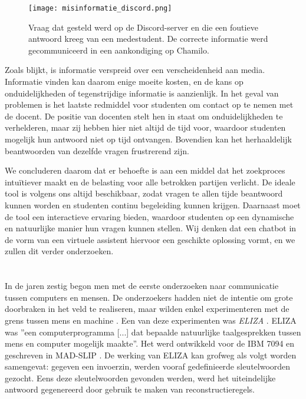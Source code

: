 \begin{figure}
  \centering
  \texttt{[image: misinformatie\_discord.png]}
  \caption[Misinformatie op Discord-server]{\label{fig:misinformatie_discord}Vraag dat gesteld werd op de Discord-server en die een foutieve antwoord kreeg van een medestudent. De correcte informatie werd gecommuniceerd in een aankondiging op Chamilo.}
\end{figure}

Zoals blijkt, is informatie verspreid over een verscheidenheid aan media. Informatie vinden kan daarom enige moeite kosten, en de kans op onduidelijkheden of tegenstrijdige informatie is aanzienlijk. In het geval van problemen is het laatste redmiddel voor studenten om contact op te nemen met de docent. De positie van docenten stelt hen in staat om onduidelijkheden te verhelderen, maar zij hebben hier niet altijd de tijd voor, waardoor studenten mogelijk hun antwoord niet op tijd ontvangen. Bovendien kan het herhaaldelijk beantwoorden van dezelfde vragen frustrerend zijn.

We concluderen daarom dat er behoefte is aan een middel dat het zoekproces intuïtiever maakt en de belasting voor alle betrokken partijen verlicht. De ideale tool is volgens ons altijd beschikbaar, zodat vragen te allen tijde beantwoord kunnen worden en studenten continu begeleiding kunnen krijgen. Daarnaast moet de tool een interactieve ervaring bieden, waardoor studenten op een dynamische en natuurlijke manier hun vragen kunnen stellen. Wij denken dat een chatbot in de vorm van een virtuele assistent hiervoor een geschikte oplossing vormt, en we zullen dit verder onderzoeken.

\section{}%
\label{sec:chatbots}

In de jaren zestig begon men met de eerste onderzoeken naar communicatie tussen computers en mensen. De onderzoekers hadden niet de intentie om grote doorbraken in het veld te realiseren, maar wilden enkel experimenteren met de grens tussen mens en machine \autocite{Dibitonto2018, AbuShawar2007}. Een van deze experimenten was \textit{ELIZA} \autocite{Weizenbaum1966}. ELIZA was ''een computerprogramma [...] dat bepaalde natuurlijke taalgesprekken tussen mens en computer mogelijk maakte''. Het werd ontwikkeld voor de IBM 7094 en geschreven in MAD-SLIP \autocite{Weizenbaum1966}. De werking van ELIZA kan grofweg als volgt worden samengevat: gegeven een invoerzin, werden vooraf gedefinieerde sleutelwoorden gezocht. Eens deze sleutelwoorden gevonden werden, werd het uiteindelijke antwoord gegenereerd door gebruik te maken van reconstructieregels. 

